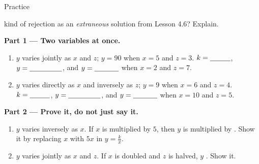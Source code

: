 \documentclass[10pt]{article}
\begin{document}
\begin{notesbox}{Practice}
\begin{enumerate}[leftmargin=1.9em, itemsep=10pt]
\begin{enumerate}[label=(\alph*), leftmargin=2.1em, itemsep=5pt]
            kind of rejection as an \emph{extraneous} solution from Lesson 4.6? Explain.
    \end{enumerate}
\end{enumerate}
\end{notesbox}

\begin{extensionbox}
\textbf{Part 1 --- Two variables at once.}
\begin{enumerate}[label=(\alph*), leftmargin=2.1em, itemsep=4pt]
  \item $y$ varies jointly as $x$ and $z$; $y=90$ when $x=5$ and $z=3$. \; $k=\blank{1.0cm}$, \;
        $y=\blank{1.6cm}$, \; and $y=\blank{1.2cm}$ when $x=2$ and $z=7$.
  \item $y$ varies directly as $x$ and inversely as $z$; $y=9$ when $x=6$ and $z=4$. \;
        $k=\blank{1.0cm}$, \; $y=\blank{1.6cm}$, \; and $y=\blank{1.2cm}$ when $x=10$ and $z=5$.
\end{enumerate}

\vspace{4pt}
\textbf{Part 2 --- Prove it, do not just say it.}
\begin{enumerate}[label=(\alph*), leftmargin=2.1em, itemsep=4pt]
  \item $y$ varies inversely as $x$. If $x$ is multiplied by $5$, then $y$ is multiplied by
        \blank{1.2cm}. Show it by replacing $x$ with $5x$ in $y=\frac kx$. \writeline
  \item $y$ varies jointly as $x$ and $z$. If $x$ is doubled and $z$ is halved, $y$ \blank{3.0cm}.
        Show it. \writeline
\end{enumerate}


\end{extensionbox}
\end{document}
